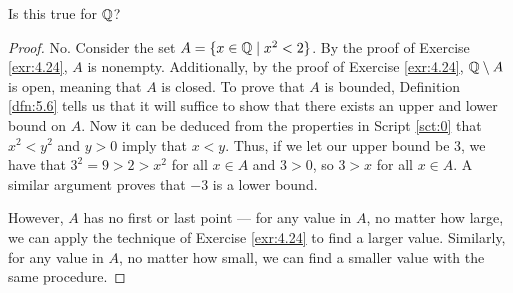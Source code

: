 \documentclass[../main.tex]{subfiles}
\begin{document}
\begin{exercise}\label{exr:5.19}
    Is this true for $\mathbb{Q}$?
    \begin{proof}
        No. Consider the set $A=\{x\in\mathbb{Q}\mid x^2<2\}$. By the proof of Exercise \ref{exr:4.24}, $A$ is nonempty. Additionally, by the proof of Exercise \ref{exr:4.24}, $\mathbb{Q}\setminus A$ is open, meaning that $A$ is closed. To prove that $A$ is bounded, Definition \ref{dfn:5.6} tells us that it will suffice to show that there exists an upper and lower bound on $A$. Now it can be deduced from the properties in Script \ref{sct:0} that $x^2<y^2$ and $y>0$ imply that $x<y$. Thus, if we let our upper bound be 3, we have that $3^2=9>2>x^2$ for all $x\in A$ and $3>0$, so $3>x$ for all $x\in A$. A similar argument proves that $-3$ is a lower bound.\par
        However, $A$ has no first or last point --- for any value in $A$, no matter how large, we can apply the technique of Exercise \ref{exr:4.24} to find a larger value. Similarly, for any value in $A$, no matter how small, we can find a smaller value with the same procedure.
    \end{proof}
\end{exercise}
\end{document}
